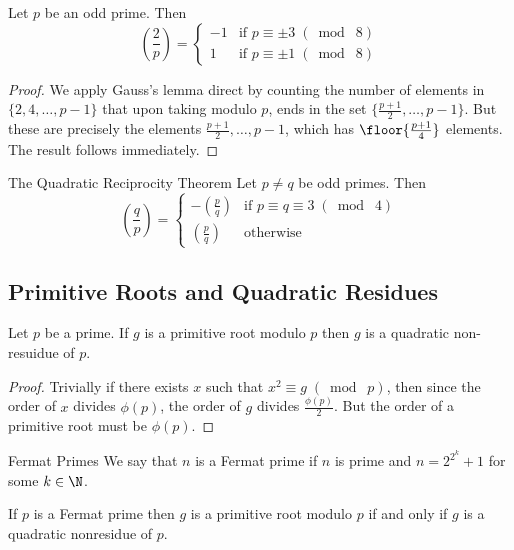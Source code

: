 \documentclass[a4paper]{article}
\begin{document}
\begin{lmm}{}{} Let $p$ be an odd prime. Then $$\left(\frac{2}{p}\right)=\begin{cases}
-1 & \text{if }p\equiv \pm3\;(\bmod\; 8)\\
1 & \text{if }p\equiv \pm1\;(\bmod\; 8)
\end{cases}$$ \tcbline
\begin{proof}
We apply Gauss's lemma direct by counting the number of elements in $\{2,4,\dots,p-1\}$ that upon taking modulo $p$, ends in the set $\{\frac{p+1}{2},\dots,p-1\}$. But these are precisely the elements $\frac{p+1}{2},\dots,p-1$, which has $\floor{\frac{p+1}{4}}$ elements. The result follows immediately. 
\end{proof}
\end{lmm}

\begin{thm}{The Quadratic Reciprocity Theorem}{} Let $p\neq q$ be odd primes. Then $$\left(\frac{q}{p}\right)=\begin{cases}
-\left(\frac{p}{q}\right) & \text{if }p\equiv q\equiv 3\;(\bmod\; 4)\\
\left(\frac{p}{q}\right) & \text{otherwise}
\end{cases}$$
\end{thm}

\subsection{Primitive Roots and Quadratic Residues}
\begin{prp}{}{} Let $p$ be a prime. If $g$ is a primitive root modulo $p$ then $g$ is a quadratic non-resuidue of $p$. \tcbline
\begin{proof}
Trivially if there exists $x$ such that $x^2\equiv g\;(\bmod\; p)$, then since the order of $x$ divides $\phi(p)$, the order of $g$ divides $\frac{\phi(p)}{2}$. But the order of a primitive root must be $\phi(p)$. 
\end{proof}
\end{prp}

\begin{defn}{Fermat Primes}{} We say that $n$ is a Fermat prime if $n$ is prime and $n=2^{2^k}+1$ for some $k\in\N$. 
\end{defn}

\begin{thm}{}{} If $p$ is a Fermat prime then $g$ is a primitive root modulo $p$ if and only if $g$ is a quadratic nonresidue of $p$. 
\end{thm}
\end{document}
